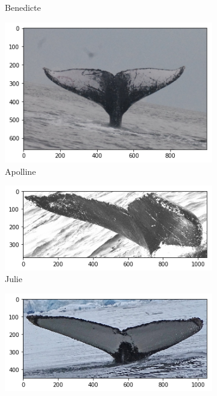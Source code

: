 \begin{frame}[c]
\begin{figure}
\begin{subfigure}[b]{0.24\linewidth}
            \caption{Benedicte}
        \end{subfigure}
        \begin{subfigure}[b]{0.24\linewidth}
            \centering
            \includegraphics[width=\linewidth]{Whales/w_73e5b74.png}
            \caption{Apolline}
        \end{subfigure}
        \begin{subfigure}[b]{0.24\linewidth}
            \centering
            \includegraphics[width=\linewidth]{Whales/w_b9e5911.png}
            \caption{Julie}
        \end{subfigure}
        \begin{subfigure}[b]{0.24\linewidth}
            \centering
            \includegraphics[width=\linewidth]{Whales/new_whale2.png}

\end{subfigure}
\end{figure}
\end{frame}

